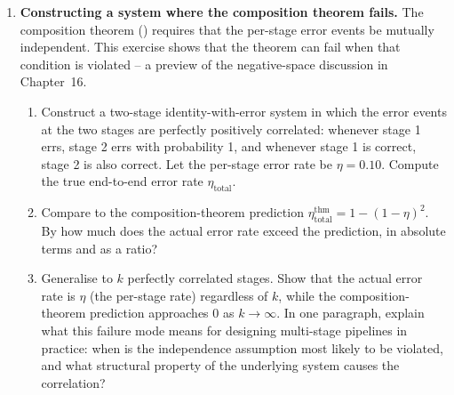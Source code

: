 \begin{enumerate}
\item \exstarstarstar
\textbf{Constructing a system where the composition theorem fails.}
The composition theorem () requires that the per-stage
error events be mutually independent. This exercise shows that the theorem
can fail when that condition is violated -- a preview of the negative-space
discussion in Chapter~16.
\begin{enumerate}
  \item[(a)] Construct a two-stage identity-with-error system in which the
    error events at the two stages are perfectly positively correlated:
    whenever stage 1 errs, stage 2 errs with probability 1, and whenever
    stage 1 is correct, stage 2 is also correct.
    Let the per-stage error rate be $\eta = 0.10$.
    Compute the true end-to-end error rate $\eta_{\mathrm{total}}$.
  \item[(b)] Compare to the composition-theorem prediction
    $\eta_{\mathrm{total}}^{\mathrm{thm}} = 1 - (1-\eta)^2$.
    By how much does the actual error rate exceed the prediction, in absolute
    terms and as a ratio?
  \item[(c)] Generalise to $k$ perfectly correlated stages.
    Show that the actual error rate is $\eta$ (the per-stage rate) regardless
    of $k$, while the composition-theorem prediction approaches 0 as
    $k \to \infty$.
    In one paragraph, explain what this failure mode means for designing
    multi-stage pipelines in practice: when is the independence assumption
    most likely to be violated, and what structural property of the
    underlying system causes the correlation?
\end{enumerate}

\end{enumerate}
